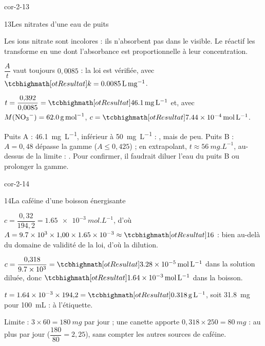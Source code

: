 \begin{blocLivre}{cor-2-13}
\begin{corrige}{13}{Les nitrates d'une eau de puits}
\begin{questions}
\item Les ions nitrate sont incolores : ils n'absorbent pas dans le visible. Le réactif les transforme en une 
dont l'absorbance est proportionnelle à leur concentration.
\item $\dfrac{A}{t}$ vaut toujours $0{,}0085$ : la loi est vérifiée, avec $\res{k=\qty{0,0085}{L.mg^{-1}}}$.
\item $t=\dfrac{0{,}392}{0{,}0085}=\res{\qty{46,1}{mg.L^{-1}}}$ et, avec $M(\ce{NO3-})=\qty{62,0}{g.mol^{-1}}$, $c=\res{\qty{7,44e-4}{mol.L^{-1}}}$.
\item Puits A : \qty{46,1}{mg.L^{-1}}, inférieur à \qty{50}{mg.L^{-1}} : , mais de peu. Puits B : $A=0{,}48$ dépasse la gamme
($A\leq0{,}425$) ; en extrapolant, $t\approx\qty{56}{mg.L^{-1}}$, au-dessus de la limite : . Pour confirmer, il faudrait
diluer l'eau du puits B ou prolonger la gamme.
\end{questions}
\end{corrige}
\end{blocLivre}
\begin{blocLivre}{cor-2-14}
\begin{corrige}{14}{La caféine d'une boisson énergisante}
\begin{questions}
\item $c=\dfrac{0{,}32}{194{,}2}=\qty{1,65e-3}{mol.L^{-1}}$, d'où $A=\num{9.7e3}\times1{,}00\times\num{1.65e-3}\approx\res{16}$ : bien au-delà du domaine de
validité de la loi, d'où la dilution.
\item $c=\dfrac{0{,}318}{\num{9.7e3}}=\res{\qty{3,28e-5}{mol.L^{-1}}}$ dans la solution diluée, donc $\res{\qty{1,64e-3}{mol.L^{-1}}}$ dans la boisson.
\item $t=\num{1.64e-3}\times194{,}2=\res{\qty{0,318}{g.L^{-1}}}$, soit \qty{31,8}{mg} pour \qty{100}{mL} :  à l'étiquette.
\item Limite : $3\times60=\qty{180}{mg}$ par jour ; une canette apporte $0{,}318\times250=\qty{80}{mg}$ : au plus  par jour
($\dfrac{180}{80}=2{,}25$), sans compter les autres sources de caféine.
\end{questions}
\end{corrige}
\end{blocLivre}
